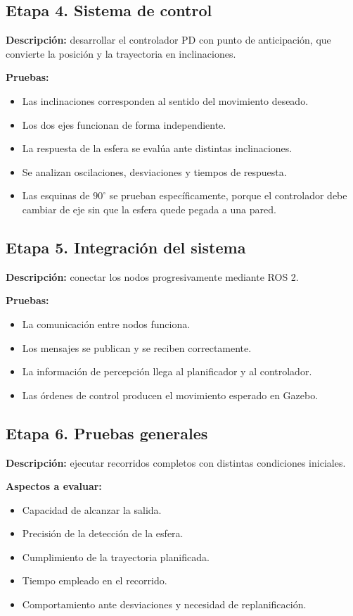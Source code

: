 \documentclass[11pt,a4paper]{article}
\begin{document}
\subsection{Etapa 4. Sistema de control}
\textbf{Descripción:} desarrollar el controlador PD con punto de anticipación, que convierte la posición y la trayectoria en inclinaciones.

\textbf{Pruebas:}
\begin{itemize}
    \item Las inclinaciones corresponden al sentido del movimiento deseado.
    \item Los dos ejes funcionan de forma independiente.
    \item La respuesta de la esfera se evalúa ante distintas inclinaciones.
    \item Se analizan oscilaciones, desviaciones y tiempos de respuesta.
    \item Las esquinas de $90^\circ$ se prueban específicamente, porque el controlador debe cambiar de eje sin que la esfera quede pegada a una pared.
\end{itemize}

\subsection{Etapa 5. Integración del sistema}
\textbf{Descripción:} conectar los nodos progresivamente mediante ROS 2.

\textbf{Pruebas:}
\begin{itemize}
    \item La comunicación entre nodos funciona.
    \item Los mensajes se publican y se reciben correctamente.
    \item La información de percepción llega al planificador y al controlador.
    \item Las órdenes de control producen el movimiento esperado en Gazebo.
\end{itemize}

\subsection{Etapa 6. Pruebas generales}
\textbf{Descripción:} ejecutar recorridos completos con distintas condiciones iniciales.

\textbf{Aspectos a evaluar:}
\begin{itemize}
    \item Capacidad de alcanzar la salida.
    \item Precisión de la detección de la esfera.
    \item Cumplimiento de la trayectoria planificada.
    \item Tiempo empleado en el recorrido.
    \item Comportamiento ante desviaciones y necesidad de replanificación.
\end{itemize}
\end{document}

